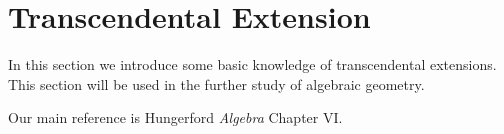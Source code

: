 \section{Transcendental Extension}
In this section we introduce some basic knowledge of transcendental extensions. This section will be used in the further study of algebraic geometry.\par
Our main reference is Hungerford \textit{Algebra} Chapter VI.